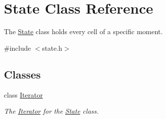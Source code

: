 \hypertarget{class_state}{}\section{State Class Reference}
\label{class_state}


The \mbox{\hyperlink{class_state}{State}} class holds every cell of a specific moment.  




{\ttfamily \#include $<$state.\+h$>$}

\subsection*{Classes}
\begin{DoxyCompactItemize}
\item 
class \mbox{\hyperlink{class_state_1_1_iterator}{Iterator}}
\begin{DoxyCompactList}\small\item\em The \mbox{\hyperlink{class_state_1_1_iterator}{Iterator}} for the \mbox{\hyperlink{class_state}{State}} class. \end{DoxyCompactList}\end{DoxyCompactItemize}
